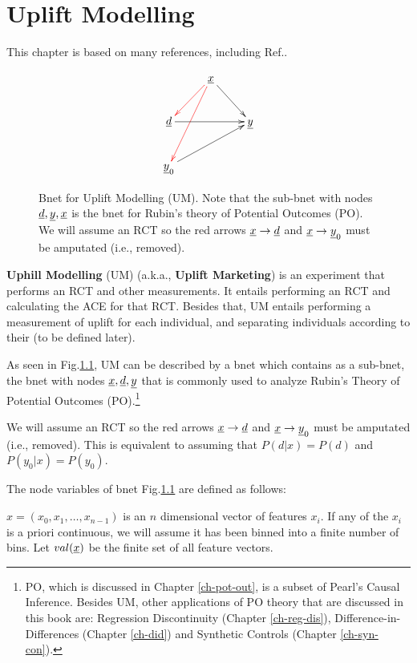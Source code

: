 \chapter{Uplift Modelling}
\label{ch-uplift}



This chapter is based 
on 
many references,
including Ref.\cite{uplift-2017, fei, wiki-uplift,jaros}.

\begin{figure}[h!]
$$\xymatrix{
&\rvx\ar@[red][dl]\ar[dr]\ar@[red][ddl]
\\
\rvd\ar[rr]
&&\rvy
\\
\rvy_0\ar[urr]
}$$
\caption{Bnet for Uplift Modelling (UM). 
Note that the sub-bnet with nodes $\rvd, \rvy, \rvx$
is the bnet for Rubin's theory of 
Potential Outcomes (PO). We will assume an RCT so the red arrows $\rvx\rarrow \rvd$ 
and $\rvx\rarrow \rvy_0$ must be amputated (i.e., removed).}
\label{fig-up-bnet}
\end{figure}



{\bf Uphill Modelling} (UM) (a.k.a., {\bf Uplift Marketing})
is an experiment that performs an
RCT and other measurements. It 
entails performing an
RCT and 
 calculating  the ACE for that  RCT.
 Besides that, UM entails performing 
a  measurement of uplift for each 
individual, and separating 
individuals according to their 
(to be defined later). 

As seen
in Fig.\ref{fig-up-bnet},
UM can be described by a bnet
which contains as a sub-bnet,
the bnet with nodes $\rvx, \rvd, \rvy$ that
is commonly used to analyze
Rubin's Theory of
Potential Outcomes (PO).\footnote{
PO, which is
discussed in Chapter \ref{ch-pot-out},
 is a subset
of Pearl's Causal Inference.
Besides UM, other  applications of PO theory
that are discussed in this book 
are: Regression Discontinuity (Chapter \ref{ch-reg-dis}),
Difference-in-Differences (Chapter \ref{ch-did})
and Synthetic Controls (Chapter \ref{ch-syn-con}).}


We will assume an RCT so the red arrows $\rvx\rarrow \rvd$ 
and $\rvx\rarrow \rvy_0$ must be amputated (i.e., removed).
This is equivalent to assuming that $P(d|x)=P(d)$ and
$P(y_0|x)=P(y_0)$.

The node variables of bnet Fig.\ref{fig-up-bnet}
are defined as follows:

$x=(x_0, x_1,\dots, x_{n-1})$ is an $n$ dimensional 
vector of features $x_i$. If any of the $x_i$
is a priori continuous, we will
assume it has  been binned into
a finite number of bins.
Let $val(\rvx)$ be the finite set of  all feature vectors.

